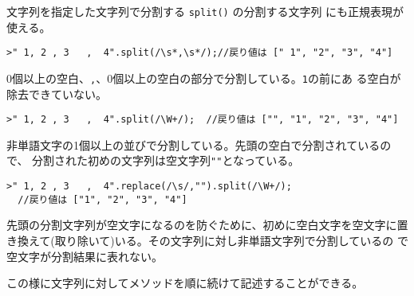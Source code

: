  \begin{Exec}\upshape
 文字列を指定した文字列で分割する \Verb+split()+ の分割する文字列
       にも正規表現が使える。
\begin{Verbatim}
>" 1, 2 , 3   ,  4".split(/\s*,\s*/);//戻り値は [" 1", "2", "3", "4"]
\end{Verbatim}
$0$個以上の空白、\Verb+,+、$0$個以上の空白の部分で分割している。\Verb+1+の前にあ
 る空白が除去できていない。
\begin{Verbatim}
>" 1, 2 , 3   ,  4".split(/\W+/);  //戻り値は ["", "1", "2", "3", "4"]
\end{Verbatim}
非単語文字の1個以上の並びで分割している。先頭の空白で分割されているので、
 分割された初めの文字列は空文字列\Verb+""+となっている。
\begin{Verbatim}
>" 1, 2 , 3   ,  4".replace(/\s/,"").split(/\W+/);
  //戻り値は ["1", "2", "3", "4"]
\end{Verbatim}
先頭の分割文字列が空文字になるのを防ぐために、初めに空白文字を空文字に置
 き換えて(取り除いて)いる。その文字列に対し非単語文字列で分割しているの
 で空文字が分割結果に表れない。

       この様に文字列に対してメソッドを順に続けて記述することができる。
 \end{Exec}




